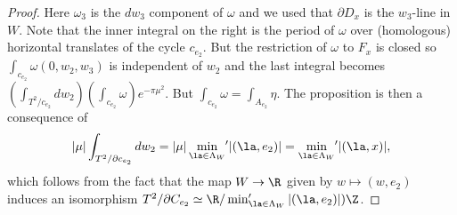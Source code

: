 \begin{proof}
Here $\omega_3$ is the $dw_3$ component of $\omega$ and we used that $\partial D_{x}$ is the $w_3$-line in $W$. Note that the inner integral on the right is the period 
of $\omega$ over (homologous) horizontal translates of the cycle $c_{e_2}$. But the restriction of $\omega$ to $F_x$ is closed so $\int_{c_{e_2}} \omega(0,w_2,w_3)$ is independent of $w_2$ and the last integral becomes
$\left( \int_{T^2/ c_{e_2}} dw_2 \right)\left( \int_{c_{e_2}} \omega \right)e^{- \pi \mu^2}$. 
 But $\int_{c_{e_2}} \omega = \int_{A_{e_2}} \eta$. The proposition is then a consequence of
\begin{equation*}
|\mu| \int_{T^2/ \partial c_{e_2}} dw_2 = |\mu| \min_{\la \in \Lambda_W} {\hspace{-2pt}'} |(\la,e_2)| = \min_{\la \in \Lambda_W} {\hspace{-2pt}'} |(\la,x)|,
\end{equation*} 
which follows from the fact that the map $W \to \R$ given by $w \mapsto (w,e_2)$ induces an isomorphism $T^2/ \partial C_{e_2} \simeq \R / \min_{\la \in \Lambda_W}'|(\la,e_2)|)\Z$. 

\end{proof}
